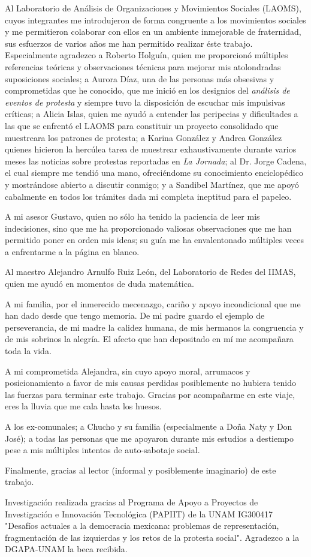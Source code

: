 \documentclass[letterpaper, 11pt]{book}
\theoremstyle{definition}
\theoremstyle{remark}
\begin{document}
\small{
Al Laboratorio de Análisis de Organizaciones y Movimientos Sociales (LAOMS), cuyos integrantes me introdujeron de forma congruente a los movimientos sociales y me permitieron colaborar con ellos en un ambiente inmejorable de fraternidad, sus esfuerzos de varios años me han permitido realizar éste trabajo. 
Especialmente agradezco a Roberto Holguín, quien me proporcionó múltiples referencias teóricas y observaciones técnicas para mejorar mis atolondradas suposiciones sociales; 
a Aurora Díaz, una de las personas más obsesivas y comprometidas que he conocido, que me inició en los designios del \emph{análisis de eventos de protesta} y siempre tuvo la disposición de escuchar mis impulsivas críticas; 
a Alicia Islas, quien me ayudó a entender las peripecias y dificultades a las que se enfrentó el LAOMS para constituir un proyecto consolidado que muestreara los patrones de protesta; 
a Karina González y Andrea González quienes hicieron la hercúlea tarea de muestrear exhaustivamente durante varios meses las noticias sobre protestas reportadas en \emph{La Jornada}; 
al Dr. Jorge Cadena, el cual siempre me tendió una mano, ofreciéndome su conocimiento enciclopédico y mostrándose abierto a discutir conmigo; 
y a Sandibel Martínez, que me apoyó cabalmente en todos los trámites dada mi completa ineptitud para el papeleo. 

A mi asesor Gustavo, quien no sólo ha tenido la paciencia de leer mis indecisiones, sino que me ha proporcionado valiosas observaciones que me han permitido poner en orden mis ideas; su guía me ha envalentonado múltiples veces a enfrentarme a la página en blanco. 

Al maestro Alejandro Arnulfo Ruiz León, del Laboratorio de Redes del IIMAS, quien me ayudó en momentos de duda matemática. 

A mi familia, por el inmerecido mecenazgo, cariño y apoyo incondicional que me han dado desde que tengo memoria. 
De mi padre guardo el ejemplo de perseverancia, de mi madre la calidez humana, de mis hermanos la congruencia y de mis sobrinos la alegría. 
El afecto que han depositado en mí me acompañara toda la vida. 

A mi comprometida Alejandra, sin cuyo apoyo moral, arrumacos y posicionamiento a favor de mis causas perdidas posiblemente no hubiera tenido las fuerzas para terminar este trabajo. 
Gracias por acompañarme en este viaje, eres la lluvia que me cala hasta los huesos. 

A los ex-comunales; 
a Chucho y su familia (especialmente a Doña Naty y Don José); 
a todas las personas que me apoyaron durante mis estudios a destiempo pese a mis múltiples intentos de auto-sabotaje social. 

Finalmente, gracias al lector (informal y posiblemente imaginario) de este trabajo. 


Investigación realizada gracias al Programa de Apoyo a Proyectos de Investigación e Innovación Tecnológica (PAPIIT) de la UNAM IG300417 "Desafíos actuales a la democracia mexicana: problemas de representación, fragmentación de las izquierdas y los retos de la protesta social". Agradezco a la DGAPA-UNAM la beca recibida.
}
\end{document}
